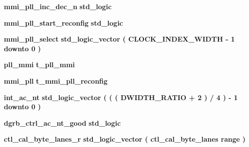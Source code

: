 \begin{DoxyCompactItemize}
{\bf mmi\+\_\+pll\+\_\+inc\+\_\+dec\+\_\+n} {\bfseries \textcolor{comment}{std\+\_\+logic}\textcolor{vhdlchar}{ }} 
\item 
{\bf mmi\+\_\+pll\+\_\+start\+\_\+reconfig} {\bfseries \textcolor{comment}{std\+\_\+logic}\textcolor{vhdlchar}{ }} 
\item 
{\bf mmi\+\_\+pll\+\_\+select} {\bfseries \textcolor{comment}{std\+\_\+logic\+\_\+vector}\textcolor{vhdlchar}{ }\textcolor{vhdlchar}{(}\textcolor{vhdlchar}{ }\textcolor{vhdlchar}{ }\textcolor{vhdlchar}{ }\textcolor{vhdlchar}{ }{\bfseries {\bf C\+L\+O\+C\+K\+\_\+\+I\+N\+D\+E\+X\+\_\+\+W\+I\+D\+TH}} \textcolor{vhdlchar}{-\/}\textcolor{vhdlchar}{ } \textcolor{vhdldigit}{1} \textcolor{vhdlchar}{ }\textcolor{keywordflow}{downto}\textcolor{vhdlchar}{ }\textcolor{vhdlchar}{ } \textcolor{vhdldigit}{0} \textcolor{vhdlchar}{ }\textcolor{vhdlchar}{)}\textcolor{vhdlchar}{ }} 
\item 
{\bf pll\+\_\+mmi} {\bfseries \textcolor{vhdlchar}{t\+\_\+pll\+\_\+mmi}\textcolor{vhdlchar}{ }} 
\item 
{\bf mmi\+\_\+pll} {\bfseries \textcolor{vhdlchar}{t\+\_\+mmi\+\_\+pll\+\_\+reconfig}\textcolor{vhdlchar}{ }} 
\item 
{\bf int\+\_\+ac\+\_\+nt} {\bfseries \textcolor{comment}{std\+\_\+logic\+\_\+vector}\textcolor{vhdlchar}{ }\textcolor{vhdlchar}{(}\textcolor{vhdlchar}{ }\textcolor{vhdlchar}{(}\textcolor{vhdlchar}{ }\textcolor{vhdlchar}{(}\textcolor{vhdlchar}{ }\textcolor{vhdlchar}{ }\textcolor{vhdlchar}{ }\textcolor{vhdlchar}{ }{\bfseries {\bf D\+W\+I\+D\+T\+H\+\_\+\+R\+A\+T\+IO}} \textcolor{vhdlchar}{+}\textcolor{vhdlchar}{ } \textcolor{vhdldigit}{2} \textcolor{vhdlchar}{ }\textcolor{vhdlchar}{)}\textcolor{vhdlchar}{ }\textcolor{vhdlchar}{/}\textcolor{vhdlchar}{ } \textcolor{vhdldigit}{4} \textcolor{vhdlchar}{ }\textcolor{vhdlchar}{)}\textcolor{vhdlchar}{ }\textcolor{vhdlchar}{-\/}\textcolor{vhdlchar}{ } \textcolor{vhdldigit}{1} \textcolor{vhdlchar}{ }\textcolor{keywordflow}{downto}\textcolor{vhdlchar}{ }\textcolor{vhdlchar}{ } \textcolor{vhdldigit}{0} \textcolor{vhdlchar}{ }\textcolor{vhdlchar}{)}\textcolor{vhdlchar}{ }} 
\item 
{\bf dgrb\+\_\+ctrl\+\_\+ac\+\_\+nt\+\_\+good} {\bfseries \textcolor{comment}{std\+\_\+logic}\textcolor{vhdlchar}{ }} 
\item 
{\bf ctl\+\_\+cal\+\_\+byte\+\_\+lanes\+\_\+r} {\bfseries \textcolor{comment}{std\+\_\+logic\+\_\+vector}\textcolor{vhdlchar}{ }\textcolor{vhdlchar}{(}\textcolor{vhdlchar}{ }{\bfseries {\bf ctl\+\_\+cal\+\_\+byte\+\_\+lanes}} \textcolor{vhdlchar}{ }\textcolor{vhdlchar}{\textquotesingle{}}\textcolor{vhdlchar}{ }\textcolor{keywordflow}{range}\textcolor{vhdlchar}{ }\textcolor{vhdlchar}{ }\textcolor{vhdlchar}{)}\textcolor{vhdlchar}{ }} 

\end{DoxyCompactItemize}
